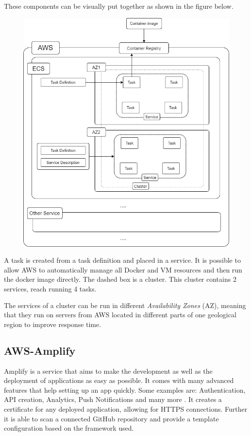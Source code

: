 These components can be visually put together as shown in the figure below. \citep[with adaptions]{AwsEcs} 
\begin{figure}[H]
\centering
\includegraphics[scale=.45]{Bilder/EcsStructure.png}
\label{ex311}
\end{figure}

A task is created from a task definition and placed in a service. It is possible to allow AWS to automatically manage all Docker and VM resources and then run the docker image directly. The dashed box is a cluster. This cluster contains 2 services, reach running 4 tasks. 

The services of a cluster can be run in different \emph{Availability Zones} (AZ), meaning that they run on servers from AWS located in different parts of one geological region to improve response time.

\subsection{AWS-Amplify}
Amplify is a service that aims to make the development as well as the deployment of applications as easy as possible. It comes with many advanced features that help setting up an app quickly. Some examples are: Authentication, API creation, Analytics, Push Notifications and many more \cite{AwsAmplify}. It creates a certificate for any deployed application, allowing for HTTPS connections. Further it is able to scan a connected GitHub repository and provide a template configuration based on the framework used.

